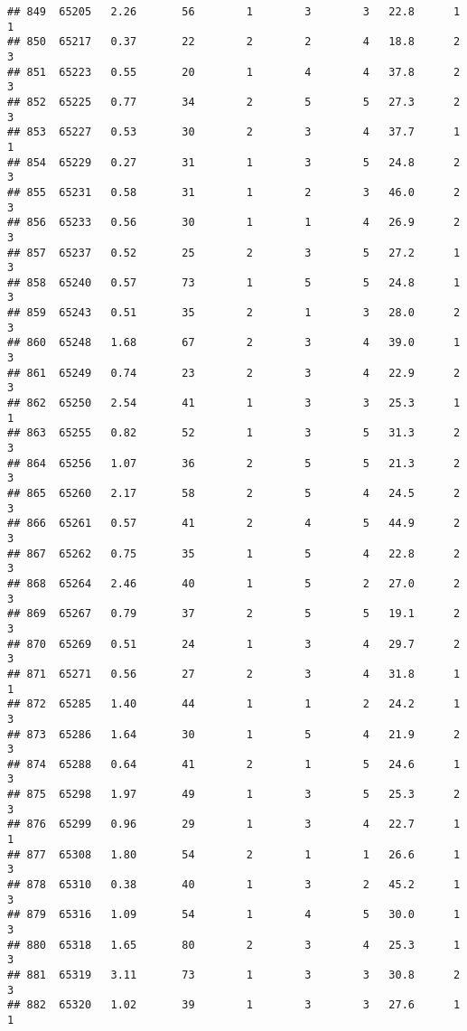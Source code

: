 \documentclass[
]{article}
\begin{document}
\begin{verbatim}
## 849  65205   2.26       56        1        3        3   22.8      1      1
## 850  65217   0.37       22        2        2        4   18.8      2      3
## 851  65223   0.55       20        1        4        4   37.8      2      3
## 852  65225   0.77       34        2        5        5   27.3      2      3
## 853  65227   0.53       30        2        3        4   37.7      1      1
## 854  65229   0.27       31        1        3        5   24.8      2      3
## 855  65231   0.58       31        1        2        3   46.0      2      3
## 856  65233   0.56       30        1        1        4   26.9      2      3
## 857  65237   0.52       25        2        3        5   27.2      1      3
## 858  65240   0.57       73        1        5        5   24.8      1      3
## 859  65243   0.51       35        2        1        3   28.0      2      3
## 860  65248   1.68       67        2        3        4   39.0      1      3
## 861  65249   0.74       23        2        3        4   22.9      2      3
## 862  65250   2.54       41        1        3        3   25.3      1      1
## 863  65255   0.82       52        1        3        5   31.3      2      3
## 864  65256   1.07       36        2        5        5   21.3      2      3
## 865  65260   2.17       58        2        5        4   24.5      2      3
## 866  65261   0.57       41        2        4        5   44.9      2      3
## 867  65262   0.75       35        1        5        4   22.8      2      3
## 868  65264   2.46       40        1        5        2   27.0      2      3
## 869  65267   0.79       37        2        5        5   19.1      2      3
## 870  65269   0.51       24        1        3        4   29.7      2      3
## 871  65271   0.56       27        2        3        4   31.8      1      1
## 872  65285   1.40       44        1        1        2   24.2      1      3
## 873  65286   1.64       30        1        5        4   21.9      2      3
## 874  65288   0.64       41        2        1        5   24.6      1      3
## 875  65298   1.97       49        1        3        5   25.3      2      3
## 876  65299   0.96       29        1        3        4   22.7      1      1
## 877  65308   1.80       54        2        1        1   26.6      1      3
## 878  65310   0.38       40        1        3        2   45.2      1      3
## 879  65316   1.09       54        1        4        5   30.0      1      3
## 880  65318   1.65       80        2        3        4   25.3      1      3
## 881  65319   3.11       73        1        3        3   30.8      2      3
## 882  65320   1.02       39        1        3        3   27.6      1      1

\end{verbatim}
\end{document}

